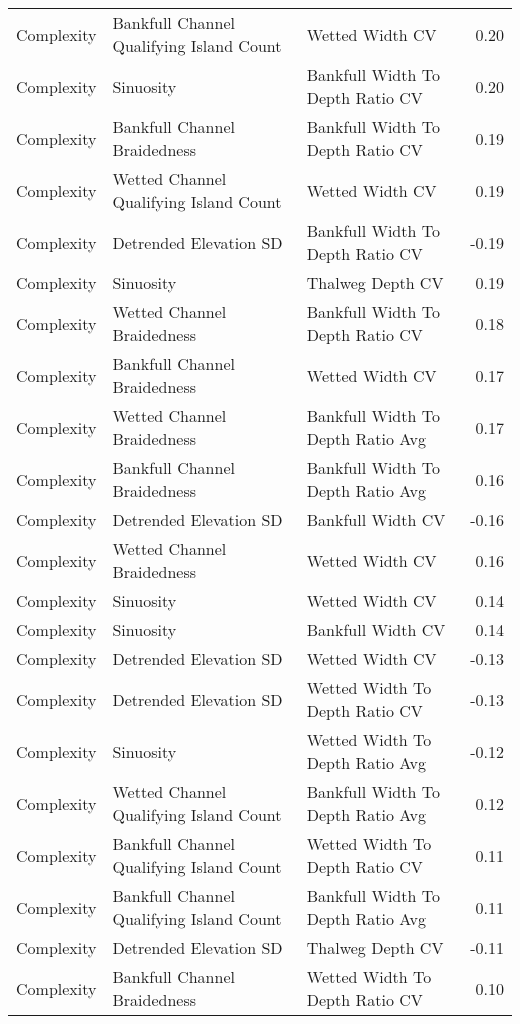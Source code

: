 \documentclass[
  12pt,
]{article}
\begin{document}
\begin{longtable}[t]{>{\raggedright\arraybackslash}p{1in}>{\raggedright\arraybackslash}p{2in}>{\raggedright\arraybackslash}p{2in}r}
\addlinespace
Complexity & Bankfull Channel Qualifying Island Count & Wetted Width CV & 0.20\\
Complexity & Sinuosity & Bankfull Width To Depth Ratio CV & 0.20\\
Complexity & Bankfull Channel Braidedness & Bankfull Width To Depth Ratio CV & 0.19\\
Complexity & Wetted Channel Qualifying Island Count & Wetted Width CV & 0.19\\
Complexity & Detrended Elevation SD & Bankfull Width To Depth Ratio CV & -0.19\\
\addlinespace
Complexity & Sinuosity & Thalweg Depth CV & 0.19\\
Complexity & Wetted Channel Braidedness & Bankfull Width To Depth Ratio CV & 0.18\\
Complexity & Bankfull Channel Braidedness & Wetted Width CV & 0.17\\
Complexity & Wetted Channel Braidedness & Bankfull Width To Depth Ratio Avg & 0.17\\
Complexity & Bankfull Channel Braidedness & Bankfull Width To Depth Ratio Avg & 0.16\\
\addlinespace
Complexity & Detrended Elevation SD & Bankfull Width CV & -0.16\\
Complexity & Wetted Channel Braidedness & Wetted Width CV & 0.16\\
Complexity & Sinuosity & Wetted Width CV & 0.14\\
Complexity & Sinuosity & Bankfull Width CV & 0.14\\
Complexity & Detrended Elevation SD & Wetted Width CV & -0.13\\
\addlinespace
Complexity & Detrended Elevation SD & Wetted Width To Depth Ratio CV & -0.13\\
Complexity & Sinuosity & Wetted Width To Depth Ratio Avg & -0.12\\
Complexity & Wetted Channel Qualifying Island Count & Bankfull Width To Depth Ratio Avg & 0.12\\
Complexity & Bankfull Channel Qualifying Island Count & Wetted Width To Depth Ratio CV & 0.11\\
Complexity & Bankfull Channel Qualifying Island Count & Bankfull Width To Depth Ratio Avg & 0.11\\
\addlinespace
Complexity & Detrended Elevation SD & Thalweg Depth CV & -0.11\\
Complexity & Bankfull Channel Braidedness & Wetted Width To Depth Ratio CV & 0.10\\

\end{longtable}
\end{document}

